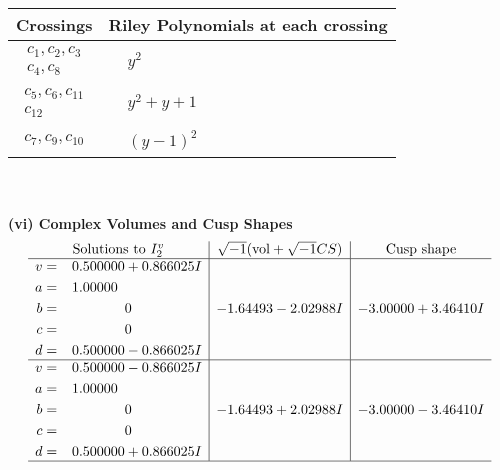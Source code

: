 \documentclass[1p]{elsarticle_modified}
\theoremstyle{definition}
\newcommand{\I}{\sqrt{-1}}
\begin{document}
\begin{tabular}{m{50pt}|m{274pt}}
Crossings & \hspace{64pt}Riley Polynomials at each crossing \\
\hline $$\begin{aligned}c_{1},c_{2},c_{3}\\c_{4},c_{8}\end{aligned}$$&$\begin{aligned}
&y^2
\end{aligned}$\\
\hline $$\begin{aligned}c_{5},c_{6},c_{11}\\c_{12}\end{aligned}$$&$\begin{aligned}
&y^2+y+1
\end{aligned}$\\
\hline $$\begin{aligned}c_{7},c_{9},c_{10}\end{aligned}$$&$\begin{aligned}
&(y-1)^2
\end{aligned}$\\
\hline
\end{tabular}\\~\\
\newpage\flushleft \textbf{(vi) Complex Volumes and Cusp Shapes}
$$\begin{array}{c|c|c}  
\text{Solutions to }I^v_{2}& \I (\text{vol} + \sqrt{-1}CS) & \text{Cusp shape}\\
 \hline 
\begin{aligned}
v &= \phantom{-}0.500000 + 0.866025 I \\
a &= \phantom{-}1.00000\phantom{ +0.000000I} \\
b &= \phantom{-0.000000 } 0 \\
c &= \phantom{-0.000000 } 0 \\
d &= \phantom{-}0.500000 - 0.866025 I\end{aligned}
 & -1.64493 - 2.02988 I & -3.00000 + 3.46410 I \\ \hline\begin{aligned}
v &= \phantom{-}0.500000 - 0.866025 I \\
a &= \phantom{-}1.00000\phantom{ +0.000000I} \\
b &= \phantom{-0.000000 } 0 \\
c &= \phantom{-0.000000 } 0 \\
d &= \phantom{-}0.500000 + 0.866025 I\end{aligned}
 & -1.64493 + 2.02988 I & -3.00000 - 3.46410 I\\
 \hline 
 \end{array}$$\newpage\newpage\renewcommand{\arraystretch}{1}
\end{document}
